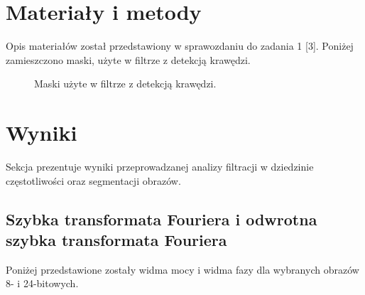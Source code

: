 \documentclass{classrep}
\begin{document}
\section{Materiały i metody}
Opis materiałów został przedstawiony w sprawozdaniu do zadania 1 [3]. Poniżej zamieszczono maski, użyte w filtrze z detekcją krawędzi.
\begin{figure}[H]%
    \centering
    \qquad
    \qquad
    \caption{Maski użyte w filtrze z detekcją krawędzi.}%
\end{figure} 

\section{Wyniki}
Sekcja prezentuje wyniki przeprowadzanej analizy filtracji w dziedzinie częstotliwości oraz segmentacji obrazów.

\subsection{Szybka transformata Fouriera i odwrotna szybka transformata Fouriera}
Poniżej przedstawione zostały widma mocy i widma fazy dla wybranych obrazów 8- i 24-bitowych.
\end{document}
